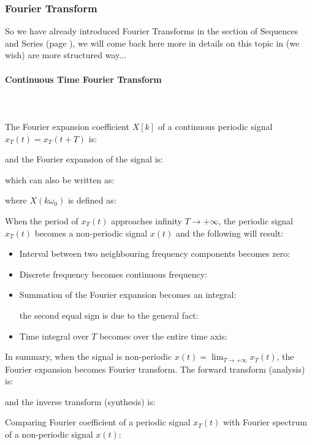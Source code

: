 	\subsubsection{Fourier Transform} \label{fourier transform analysis}
	So we have already introduced Fourier Transforms in the section of Sequences and Series (page \pageref{fourier transform}), we will come back here more in details on this topic in (we wish) are more structured way...
	
	\paragraph{Continuous Time Fourier Transform}\mbox{}\\\\	
	The Fourier expansion coefficient $X[k]$ of a continuous periodic  signal $x_T(t)=x_T(t+T)$ is:
	
	and the Fourier expansion of the signal is:
	
	which can also be written as:
	
	where $X(k\omega_0)$ is defined as:
	
	
	When the period of $x_T(t)$ approaches infinity $T \rightarrow +\infty $, the 
	periodic signal $x_T(t)$ becomes a non-periodic signal $x(t)$ and the following 
	will result:
	\begin{itemize}
	
	\item Interval between two neighbouring frequency components becomes zero:
	
	
	\item Discrete frequency becomes continuous frequency:
	
	
	\item Summation of the Fourier expansion becomes an integral:
	
	the second equal sign is due to the general fact:
	
	
	\item Time integral over $T$ becomes over the entire time axis:
	
	\end{itemize}
	
	In summary, when the signal is non-periodic $x(t)=\lim_{T\rightarrow +\infty}x_T(t)$, the Fourier expansion becomes Fourier transform. The forward transform (analysis) is:
	
	and the inverse transform (synthesis) is:
	
	
	Comparing Fourier coefficient of a periodic signal $x_T(t)$ with Fourier spectrum of a non-periodic signal $x(t)$:
	
